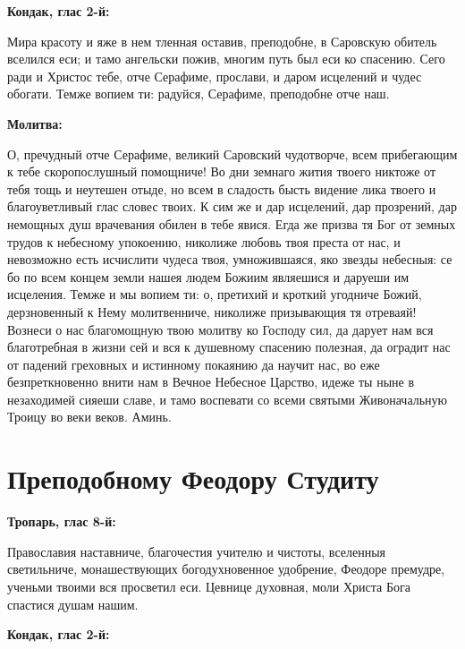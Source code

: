 \medskip


\bfseries Кондак, глас 2-й:\normalfont{}\nopagebreak


Мира красоту и яже в нем тленная оставив, преподобне, в Саровскую обитель вселился еси; и тамо ангельски пожив, многим путь был еси ко спасению. Сего ради и Христос тебе, отче Серафиме, прослави, и даром исцелений и чудес обогати. Темже вопием ти: радуйся, Серафиме, преподобне отче наш.


\medskip


\bfseries Молитва:\normalfont{}\nopagebreak


О, пречудный отче Серафиме, великий Саровский чудотворче, всем прибегающим к тебе скоропослушный помощниче! Во дни земнаго жития твоего никтоже от тебя тощь и неутешен отыде, но всем в сладость бысть видение лика твоего и благоуветливый глас словес твоих. К сим же и дар исцелений, дар прозрений, дар немощных душ врачевания обилен в тебе явися. Егда же призва тя Бог от земных трудов к небесному упокоению, николиже любовь твоя преста от нас, и невозможно есть исчислити чудеса твоя, умножившаяся, яко звезды небесныя: се бо по всем концем земли нашея людем Божиим являешися и даруеши им исцеления. Темже и мы вопием ти: о, претихий и кроткий угодниче Божий, дерзновенный к Нему молитвенниче, николиже призывающия тя отреваяй! Вознеси о нас благомощную твою молитву ко Господу сил, да дарует нам вся благотребная в жизни сей и вся к душевному спасению полезная, да оградит нас от падений греховных и истинному покаянию да научит нас, во еже безпреткновенно внити нам в Вечное Небесное Царство, идеже ты ныне в незаходимей сияеши славе, и тамо воспевати со всеми святыми Живоначальную Троицу во веки веков. Аминь.


\section{Преподобному Феодору Студиту}
 


\bfseries Тропарь, глас 8-й:\normalfont{}\nopagebreak


Православия наставниче, благочестия учителю и чистоты, вселенныя светильниче, монашествующих богодухновенное удобрение, Феодоре премудре, ученьми твоими вся просветил еси. Цевнице духовная, моли Христа Бога спастися душам нашим.


\medskip


\bfseries Кондак, глас 2-й:\normalfont{}\nopagebreak


